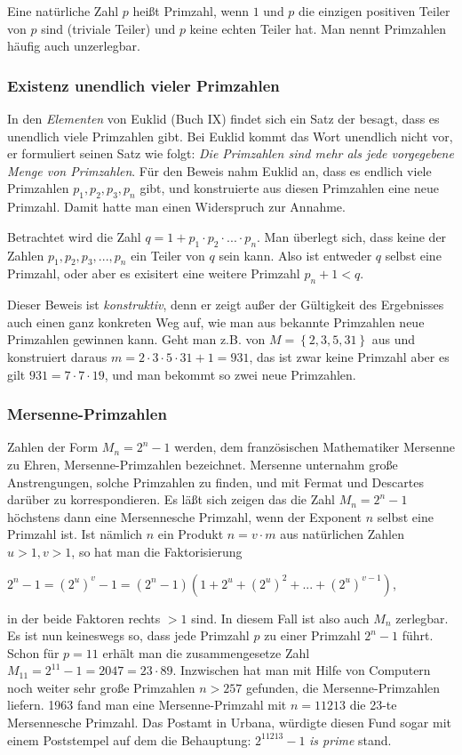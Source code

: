 \documentclass[10pt, bigheadings]{scrartcl}
\begin{document}
Eine natürliche Zahl $p$ heißt Primzahl, wenn $1$ und $p$ die einzigen
positiven Teiler von $p$ sind (triviale Teiler) und $p$ keine echten Teiler
hat. Man nennt Primzahlen häufig auch unzerlegbar.

\subsubsection*{Existenz unendlich vieler Primzahlen}
In den \textit{Elementen} von Euklid (Buch IX) findet sich ein Satz der besagt,
dass es unendlich viele Primzahlen gibt. Bei Euklid kommt das Wort
unendlich nicht vor, er formuliert seinen Satz wie folgt: \textit{Die
Primzahlen sind mehr als jede vorgegebene Menge von Primzahlen}. Für den Beweis
nahm Euklid an, dass es endlich viele Primzahlen $p_1, p_2, p_3 , p_n$ gibt,
und konstruierte aus diesen Primzahlen eine neue Primzahl.
Damit hatte man einen Widerspruch zur Annahme.

Betrachtet wird die Zahl $q = 1 + p_1 \cdot p_2 \cdot ... \cdot p_n $. Man
überlegt sich, dass keine der Zahlen $p_1, p_2, p_3, ... , p_n$ ein Teiler von
$q$ sein kann.
Also ist entweder $q$ selbst eine Primzahl, oder aber es exisitert eine weitere
Primzahl $p_n+1 < q$.

Dieser Beweis ist \textit{konstruktiv}, denn er zeigt außer der Gültigkeit des
Ergebnisses auch einen ganz konkreten Weg auf, wie man aus bekannte Primzahlen
neue Primzahlen gewinnen kann. Geht man z.B. von
$M = \left\lbrace 2, 3, 5, 31 \right\rbrace $ aus und konstruiert daraus
$ m = 2 \cdot 3 \cdot 5 \cdot 31 + 1 = 931$, das ist zwar keine Primzahl aber es
gilt $931 = 7 \cdot 7 \cdot 19$, und man bekommt so zwei neue Primzahlen.

\subsubsection*{Mersenne-Primzahlen}
Zahlen der Form $M_n = 2^n - 1 $ werden, dem französischen Mathematiker Mersenne
zu Ehren, Mersenne-Primzahlen bezeichnet. Mersenne unternahm große
Anstrengungen, solche Primzahlen zu finden, und mit Fermat und Descartes
darüber zu korrespondieren. Es läßt sich zeigen das die Zahl $M_n = 2^n -1 $
höchstens dann eine Mersennesche Primzahl, wenn der Exponent $n$ selbst eine
Primzahl ist. Ist nämlich $n$ ein Produkt $n = v\cdot m$ aus natürlichen Zahlen
$u>1, v>1$,  so hat man die Faktorisierung
\begin{center}
{$2^n -1 = (2^u)^v - 1 = (2^n-1)(1+2^u+(2^u)^2+...+(2^u)^{v-1})$},
\end{center}
in der beide Faktoren rechts $>1$ sind. In diesem Fall ist also auch $M_n$
zerlegbar. Es ist nun keineswegs so, dass jede Primzahl $p$ zu einer
Primzahl $2^n-1$ führt. Schon für $p = 11$ erhält man die zusammengesetze
Zahl $M_{11} = 2^{11} - 1 = 2047 = 23 \cdot 89$. Inzwischen hat man mit Hilfe von
Computern noch weiter sehr große Primzahlen $n>257$ gefunden, die
Mersenne-Primzahlen liefern. 1963 fand man eine Mersenne-Primzahl mit
$n = 11213$ die 23-te Mersennesche Primzahl. Das Postamt in Urbana,
würdigte diesen Fund sogar mit einem Poststempel auf dem die Behauptung:
$2^{11213}-1$ \textit{is prime} stand.
\end{document}
